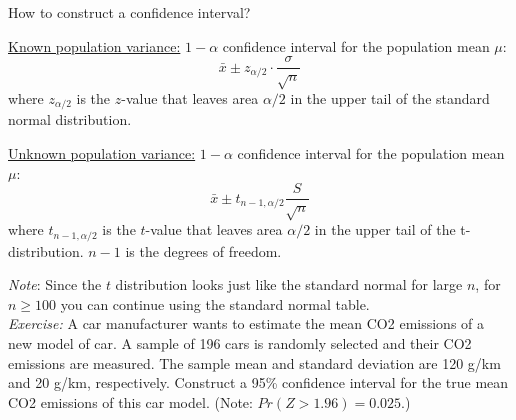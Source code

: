 \documentclass{./../../Latex/handout}
\begin{document}
\thispagestyle{plain}

\vspace{-1.5em}
How to construct a confidence interval? 

 \underline{Known population variance:} $1-\alpha$ confidence interval for the population mean $\mu$:
$$ \bar{x} \pm  z_{\alpha/2} \cdot \frac{\sigma}{\sqrt{n}} $$
where $z_{\alpha/2}$ is the $z$-value that leaves area $\alpha/2$ in the upper tail of the standard normal distribution.

\underline{Unknown population variance:} $1-\alpha$ confidence interval for the population mean $\mu$:
$$ \bar{x} \pm  t_{n-1,\alpha/2}  \frac{S}{\sqrt{n}} $$
where $t_{n-1,\alpha/2}$ is the $t$-value that leaves area $\alpha/2$ in the upper tail of the t-distribution. $n-1$ is the degrees of freedom. 

\textit{Note}: Since the $t$ distribution looks just like the standard normal for large $n$, for $n\geq 100$ you can continue using the standard normal table. \\


\textit{Exercise:} A car manufacturer wants to estimate the mean CO2 emissions of a new model of car. A sample of 196 cars is randomly selected and their CO2 emissions are measured. The sample mean and standard deviation are 120 g/km and 20 g/km, respectively. Construct a 95\% confidence interval for the true mean CO2 emissions of this car model. (Note: $Pr(Z>1.96)=0.025$.)
\end{document}
